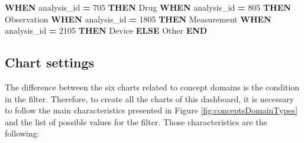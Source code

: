 \documentclass[
]{book}
\newenvironment{Shaded}{\begin{snugshade}}{\end{snugshade}}
\newcommand{\ControlFlowTok}[1]{\textcolor[rgb]{0.13,0.29,0.53}{\textbf{#1}}}
\newcommand{\DecValTok}[1]{\textcolor[rgb]{0.00,0.00,0.81}{#1}}
\newcommand{\NormalTok}[1]{#1}
\newcommand{\OperatorTok}[1]{\textcolor[rgb]{0.81,0.36,0.00}{\textbf{#1}}}
\newcommand{\StringTok}[1]{\textcolor[rgb]{0.31,0.60,0.02}{#1}}
\begin{document}
\begin{Shaded}
\begin{Highlighting}[]
    \ControlFlowTok{WHEN}\NormalTok{ analysis\_id }\OperatorTok{=} \DecValTok{705} \ControlFlowTok{THEN} \StringTok{\textquotesingle{}Drug\textquotesingle{}}
    \ControlFlowTok{WHEN}\NormalTok{ analysis\_id }\OperatorTok{=} \DecValTok{805} \ControlFlowTok{THEN} \StringTok{\textquotesingle{}Observation\textquotesingle{}}
    \ControlFlowTok{WHEN}\NormalTok{ analysis\_id }\OperatorTok{=} \DecValTok{1805} \ControlFlowTok{THEN} \StringTok{\textquotesingle{}Measurement\textquotesingle{}}
    \ControlFlowTok{WHEN}\NormalTok{ analysis\_id }\OperatorTok{=} \DecValTok{2105} \ControlFlowTok{THEN} \StringTok{\textquotesingle{}Device\textquotesingle{}}
    \ControlFlowTok{ELSE} \StringTok{\textquotesingle{}Other\textquotesingle{}} \ControlFlowTok{END}
\end{Highlighting}
\end{Shaded}

\hypertarget{chart-settings-22}{%
\subsection{Chart settings}\label{chart-settings-22}}

The difference between the six charts related to concept domains is the condition in the filter. Therefore, to create all the charts of this dashboard, it is necessary to follow the main characteristics presented in Figure \ref{fig:conceptsDomainTypes} and the list of possible values for the filter. Those characteristics are the following:
\end{document}
